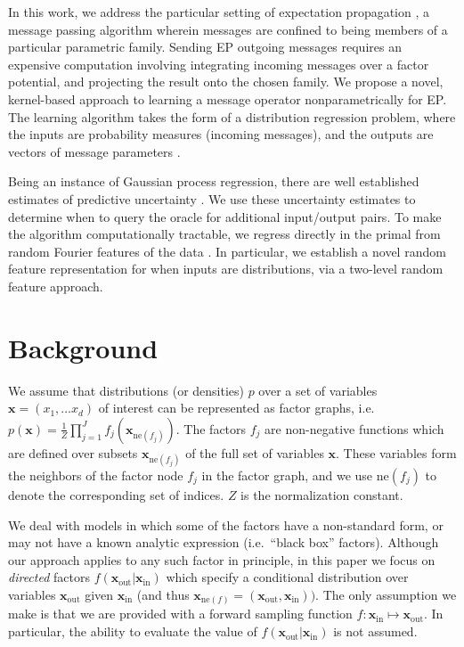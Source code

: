 \documentclass[english]{article}
\theoremstyle{plain}
\theoremstyle{plain}
\newcommand{\bx}{\mathbf{x}}				%
\newcommand{\factor}{f}				%
\newcommand{\fis}[1]{\mathrm{ne}(#1)}   	%
\newcommand{\fx}[1]{ \mathbf{x}_{\mathrm{ne}(#1)} }   	%
\newcommand{\xin}{\mathbf{x}_{ \mathrm{in} }} 			%
\newcommand{\xout}{\mathbf{x}_{ \mathrm{out} }}			%
\begin{document}
In this work, we address the particular setting of expectation propagation 
\citep[EP;][]{Minka2001}, a message passing algorithm wherein messages are confined to
being members of a particular parametric family. Sending EP outgoing messages
requires an expensive computation involving integrating incoming messages over a
factor potential, and projecting the result onto the chosen family. We propose
a novel, kernel-based approach to learning a message operator nonparametrically
for EP. The learning algorithm takes the form of a
distribution regression problem, where the inputs are probability measures (incoming messages), and
the outputs are vectors of message parameters \citep{Szabo2014}.  

Being an instance of Gaussian process regression, there are well established
estimates of predictive uncertainty \citep[Ch. 2]{RasWil06}.  We use these
uncertainty estimates to determine when to query the oracle for
additional input/output pairs.  To make the algorithm computationally
tractable, we regress  directly in the primal from random Fourier features of
the data \citep{Rahimi2007,Le2013,YanSmoZonWil14}.  In particular, we establish
a novel random feature representation for when inputs are distributions, via a
two-level random feature approach.




\section{Background}
\label{sec:EP}

We assume that distributions (or densities) $p$ over a set of variables 
$\bx = (x_1, \dots x_d)$ of interest can be represented as factor graphs, i.e.\
%
$p(\bx) = \frac{1}{Z} \prod_{j=1}^J \factor_j(\fx{\factor_j})$.
The factors $\factor_j$ are non-negative functions which are defined over subsets $\fx{\factor_j}$ of the full set of variables $\bx$. These variables form the neighbors of the factor node $\factor_j$ in the factor graph, and we use $\fis{\factor_j}$ to denote the corresponding set of indices. $Z$ is the normalization constant.

We deal with models in which some of the factors have a non-standard form, or
may not have a known analytic expression (i.e.\ ``black box'' factors).
Although our approach applies to any such factor in principle, in this paper we
focus on \textit{directed} factors $\factor(\xout | \xin)$ which specify a
conditional distribution over variables $\xout$ given $\xin$ (and thus
$\fx{\factor} = (\xout, \xin))$. The only assumption we make is that we are
provided with a forward sampling function $f: \xin \mapsto \xout$. 
In particular, the ability to evaluate the value of $\factor(\xout | \xin)$ is
not assumed.
\end{document}
